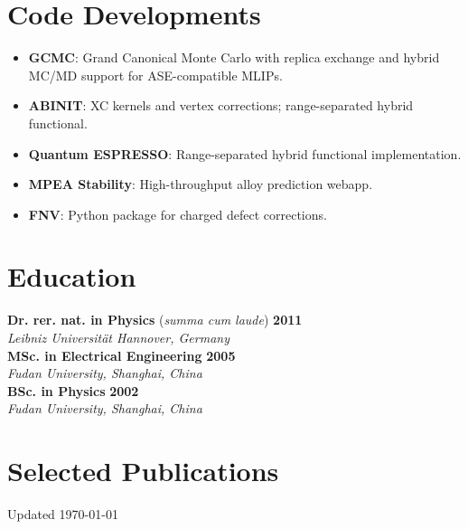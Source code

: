 \documentclass[a4paper,11pt,oneside]{article}
\begin{document}
\section*{Code Developments}
\begin{itemize}[leftmargin=*, nosep, itemsep=2pt]
    \item \textbf{GCMC}: Grand Canonical Monte Carlo with replica exchange and hybrid MC/MD support for ASE-compatible MLIPs.
    \item \textbf{ABINIT}: XC kernels and vertex corrections; range-separated hybrid functional.
    \item \textbf{Quantum ESPRESSO}: Range-separated hybrid functional implementation.
    \item \textbf{MPEA Stability}: High-throughput alloy prediction webapp.
    \item \textbf{FNV}: Python package for charged defect corrections.
\end{itemize}

\section*{Education}
\textbf{Dr. rer. nat. in Physics} (\textit{summa cum laude}) \hfill \textbf{2011} \\
\textit{Leibniz Universität Hannover, Germany} \\
\textbf{MSc. in Electrical Engineering} \hfill \textbf{2005} \\
\textit{Fudan University, Shanghai, China} \\
\textbf{BSc. in Physics} \hfill \textbf{2002} \\
\textit{Fudan University, Shanghai, China}

\section*{Selected Publications}
\nocite{Chen2023, Chen2021, Chen2019, Chen2016, Chen2015}
\printbibliography[heading=none]

\vfill
\scriptsize \color{textgrey} Updated {\today}
\end{document}
